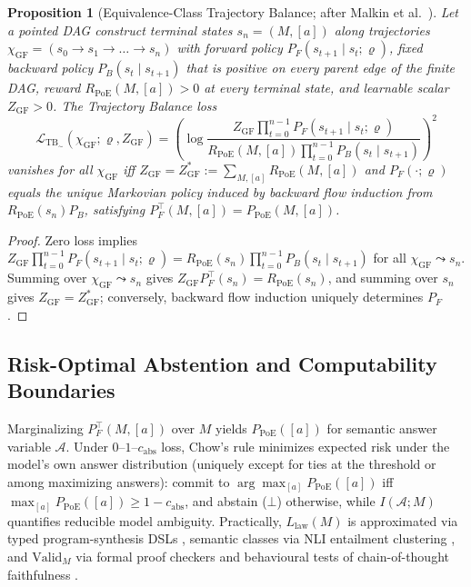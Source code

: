 \documentclass[11pt,a4paper]{article}
\newtheorem{proposition}{Proposition}
\theoremstyle{definition}
\theoremstyle{remark}
\newcommand{\Valid}{\mathrm{Valid}}
\begin{document}
\begin{proposition}[Equivalence-Class Trajectory Balance; after Malkin et al.\ \cite{malkin2022trajectory}]
\label{prop:gflownet}
Let a pointed DAG construct terminal states $s_n = (M, [a])$ along trajectories $\chi_{\mathrm{GF}} = (s_0 \to s_1 \to \dots \to s_n)$ with forward policy $P_F(s_{t+1} \mid s_t; \varrho)$, fixed backward policy $P_B(s_t \mid s_{t+1})$ that is positive on every parent edge of the finite DAG, reward $R_{\mathrm{PoE}}(M, [a]) > 0$ at every terminal state, and learnable scalar $Z_{\mathrm{GF}} > 0$. The Trajectory Balance loss
\begin{equation}
  \mathcal{L}_{\mathrm{TB}_\sim}(\chi_{\mathrm{GF}}; \varrho, Z_{\mathrm{GF}})
  = \left( \log \frac{Z_{\mathrm{GF}} \prod_{t=0}^{n-1} P_F(s_{t+1} \mid s_t; \varrho)}{R_{\mathrm{PoE}}(M, [a]) \prod_{t=0}^{n-1} P_B(s_t \mid s_{t+1})} \right)^2
  \label{eq:tb_loss}
\end{equation}
vanishes for all $\chi_{\mathrm{GF}}$ iff $Z_{\mathrm{GF}} = Z_{\mathrm{GF}}^* := \sum_{M,[a]} R_{\mathrm{PoE}}(M,[a])$ and $P_F(\cdot; \varrho)$ equals the unique Markovian policy induced by backward flow induction from $R_{\mathrm{PoE}}(s_n) P_B$, satisfying $P_F^\top(M, [a]) = P_{\mathrm{PoE}}(M, [a])$.
\end{proposition}

\begin{proof}
Zero loss implies $Z_{\mathrm{GF}} \prod_{t=0}^{n-1} P_F(s_{t+1} \mid s_t; \varrho) = R_{\mathrm{PoE}}(s_n) \prod_{t=0}^{n-1} P_B(s_t \mid s_{t+1})$ for all $\chi_{\mathrm{GF}} \leadsto s_n$. Summing over $\chi_{\mathrm{GF}} \leadsto s_n$ gives $Z_{\mathrm{GF}} P_F^\top(s_n) = R_{\mathrm{PoE}}(s_n)$, and summing over $s_n$ gives $Z_{\mathrm{GF}} = Z_{\mathrm{GF}}^*$; conversely, backward flow induction uniquely determines $P_F$ \cite{malkin2022trajectory}.
\end{proof}

\subsection{Risk-Optimal Abstention and Computability Boundaries}

Marginalizing $P_F^\top(M, [a])$ over $M$ yields $P_{\mathrm{PoE}}([a])$ for semantic answer variable $\mathcal{A}$. Under $0\text{--}1\text{--}c_{\mathrm{abs}}$ loss, Chow's rule \cite{chow1970optimum} minimizes expected risk under the model's own answer distribution (uniquely except for ties at the threshold or among maximizing answers): commit to $\arg\max_{[a]} P_{\mathrm{PoE}}([a])$ iff $\max_{[a]} P_{\mathrm{PoE}}([a]) \ge 1 - c_{\mathrm{abs}}$, and abstain ($\bot$) otherwise, while $I(\mathcal{A}; M)$ \cite{lindley1956measure,houlsby2011bayesian} quantifies reducible model ambiguity. Practically, $L_{\mathrm{law}}(M)$ is approximated via typed program-synthesis DSLs \cite{ellis2021dreamcoder}, semantic classes via NLI entailment clustering \cite{farquhar2024detecting}, and $\Valid_M$ via formal proof checkers and behavioural tests of chain-of-thought faithfulness \cite{turpin2023language,lanham2023measuring}.
\end{document}
